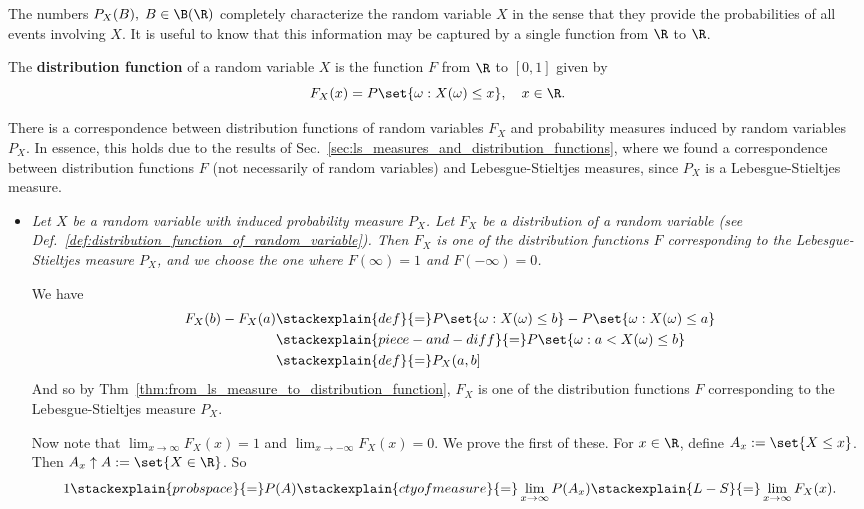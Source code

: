 \documentclass{article} %
\begin{document}
The numbers $P_X(B), \; B \in \B(\R)$ completely characterize the random variable $X$ in the sense that they provide the probabilities of all events involving $X$.  It is useful to know that this information may be captured by a single function from $\R$ to $\R$.

\begin{definition}
The \textbf{distribution function} of a random variable $X$ is the function $F$ from $\R$ to $[0,1]$ given by 
\[F_X(x) = P\set{\omega : X(\omega) \leq x}, \quad x \in \R.\]
\label{def:distribution_function_of_random_variable}
\end{definition}

 
 \begin{remark}{}
There is a correspondence between distribution functions of random variables $F_X$ and probability measures induced by random variables $P_X$.  In essence, this holds due to the results of Sec.~\ref{sec:ls_measures_and_distribution_functions}, where we found a correspondence between distribution functions $F$ (not necessarily of random variables) and Lebesgue-Stieltjes measures, since $P_X$ is a Lebesgue-Stieltjes measure. 
\begin{itemize}
\item \textit{Let $X$ be a random variable with induced probability measure $P_X$.  Let $F_X$ be a distribution of a random variable (see Def.~\ref{def:distribution_function_of_random_variable}).   Then $F_X$ is one of the distribution functions $F$ corresponding to the Lebesgue-Stieltjes measure $P_X$, and we choose the one where $F(\infty)=1$ and $F(-\infty)=0$.} 

We have
\begin{align*}
F_X(b)-F_X(a) &\stackexplain{def}{=} P \set{\omega : X(\omega) \leq b} - P\set{\omega : X(\omega) \leq a} \\
& \stackexplain{piece-and-diff}{=} P\set{\omega : a < X(\omega) \leq b} \\
&\stackexplain{def}{=} P_X(a,b]
\end{align*}
And so by Thm~\ref{thm:from_ls_measure_to_distribution_function}, $F_X$ is one of the distribution functions $F$ corresponding to the Lebesgue-Stieltjes measure $P_X$. 

Now note that $\lim_{x \to \infty} F_X(x) =1$ and $\lim_{x \to -\infty} F_X(x) =0$. We prove the first of these. For $x \in \R$, define $A_x := \set{X \leq x}$. Then $A_x \uparrow A := \set{X \in \R}$. So
\[ 1 \stackexplain{prob space}{=} P(A) \stackexplain{cty of measure}{=} \lim_{x \to \infty} P(A_x) \stackexplain{L-S}{=} \lim_{x \to \infty} F_X(x).   \]
 

\end{itemize}
\end{remark}
\end{document}
